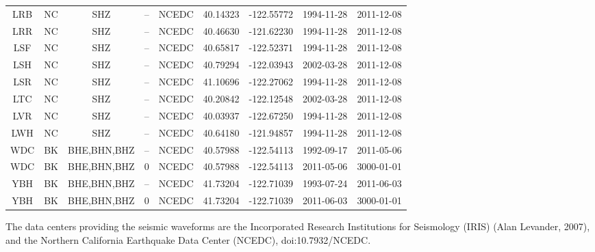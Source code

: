 \documentclass[draft]{agujournal2019}
\begin{document}
{\begin{table}
\begin{tabular}{c c c c c c c c c}
LRB & NC & SHZ & -- & NCEDC & 40.14323 & -122.55772 & 1994-11-28 & 2011-12-08 \\
LRR & NC & SHZ & -- & NCEDC & 40.46630 & -121.62230 & 1994-11-28 & 2011-12-08 \\
LSF & NC & SHZ & -- & NCEDC & 40.65817 & -122.52371 & 1994-11-28 & 2011-12-08 \\
LSH & NC & SHZ & -- & NCEDC & 40.79294 & -122.03943 & 2002-03-28 & 2011-12-08 \\
LSR & NC & SHZ & -- & NCEDC & 41.10696 & -122.27062 & 1994-11-28 & 2011-12-08 \\
LTC & NC & SHZ & -- & NCEDC & 40.20842 & -122.12548 & 2002-03-28 & 2011-12-08 \\
LVR & NC & SHZ & -- & NCEDC & 40.03937 & -122.67250 & 1994-11-28 & 2011-12-08 \\
LWH & NC & SHZ & -- & NCEDC & 40.64180 & -121.94857 & 1994-11-28 & 2011-12-08 \\
WDC & BK & BHE,BHN,BHZ & -- & NCEDC & 40.57988 & -122.54113 & 1992-09-17 & 2011-05-06 \\
WDC & BK & BHE,BHN,BHZ & 0 & NCEDC & 40.57988 & -122.54113 & 2011-05-06 & 3000-01-01 \\
YBH & BK & BHE,BHN,BHZ & -- & NCEDC & 41.73204 & -122.71039 & 1993-07-24 & 2011-06-03 \\
YBH & BK & BHE,BHN,BHZ & 0 & NCEDC & 41.73204 & -122.71039 & 2011-06-03 & 3000-01-01 \\
\hline
\end{tabular}
\end{table}
}

The data centers providing the seismic waveforms are the Incorporated Research Institutions for Seismology (IRIS) (Alan Levander, 2007), and the Northern California Earthquake Data Center (NCEDC), doi:10.7932/NCEDC.
\end{document}
